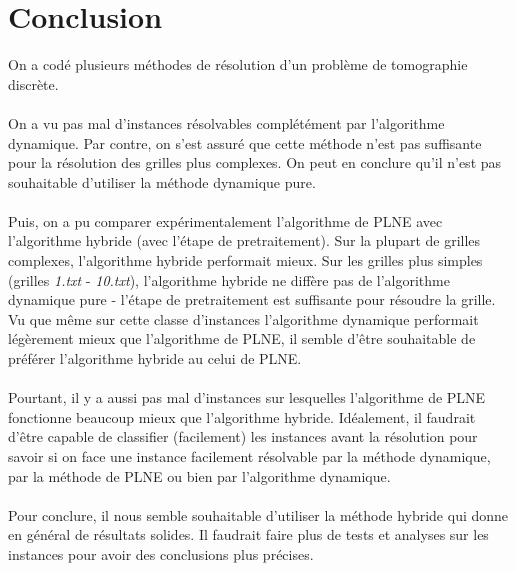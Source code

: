 \documentclass[10pt,a4paper]{article}
\begin{document}
\section*{Conclusion}
\noindent
On a codé plusieurs méthodes de résolution d'un problème de tomographie discrète. \\ \\
\noindent
On a vu pas mal d'instances résolvables complétément par l'algorithme dynamique. Par contre, on s'est assuré que cette méthode n'est pas suffisante pour la résolution des grilles plus complexes. On peut en conclure qu'il n'est pas souhaitable d'utiliser la méthode dynamique pure. \\ \\
\noindent
Puis, on a pu comparer expérimentalement l'algorithme de PLNE avec l'algorithme hybride (avec l'étape de pretraitement). Sur la plupart de grilles complexes, l'algorithme hybride performait mieux. Sur les grilles plus simples (grilles \textit{1.txt} - \textit{10.txt}), l'algorithme hybride ne diffère pas de l'algorithme dynamique pure - l'étape de pretraitement est suffisante pour résoudre la grille. Vu que même sur cette classe d'instances l'algorithme dynamique performait légèrement mieux que l'algorithme de PLNE, il semble d'être souhaitable de préférer l'algorithme hybride au celui de PLNE. \\ \\
\noindent
Pourtant, il y a aussi pas mal d'instances sur lesquelles l'algorithme de PLNE fonctionne beaucoup mieux que l'algorithme hybride. Idéalement, il faudrait d'être capable de classifier (facilement) les instances avant la résolution pour savoir si on face une instance facilement résolvable par la méthode dynamique, par la méthode de PLNE ou bien par l'algorithme dynamique. \\ \\
\noindent
Pour conclure, il nous semble souhaitable d'utiliser la méthode hybride qui donne en général de résultats solides. Il faudrait faire plus de tests et analyses sur les instances pour avoir des conclusions plus précises. \\  
\noindent 
\newpage
\end{document}
